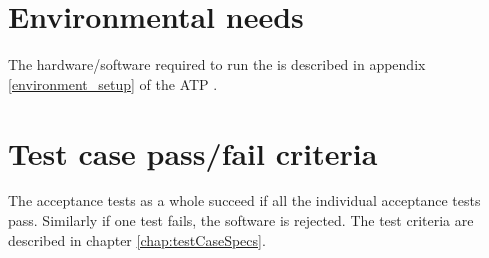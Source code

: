 \section{Environmental needs}
The hardware/software required to run the \applicationname{} is described in appendix \ref{environment_setup} of the ATP \cite{atp}.

\section{Test case pass/fail criteria}
The acceptance tests as a whole succeed if all the individual acceptance tests pass. Similarly if one test fails, the software is rejected.
The test criteria are described in chapter \ref{chap:testCaseSpecs}.